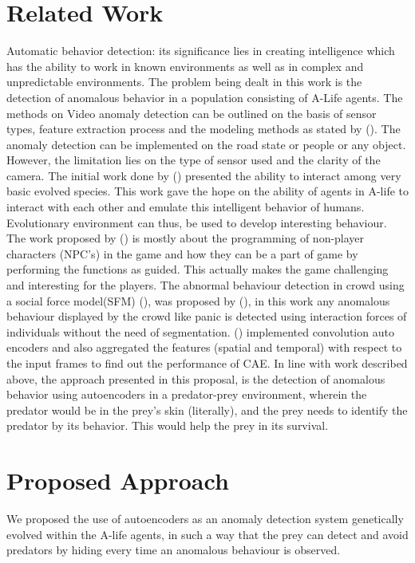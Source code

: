 \documentclass[letterpaper]{article}
\newcommand{\citea}[1]{\citeauthor{#1} (\citeyear{#1})}
\numberwithin{equation}{section}
\numberwithin{theorem}{section}
\numberwithin{lemma}{section}
\numberwithin{df}{section}
\begin{document}
\section{Related Work}

Automatic behavior detection: its significance lies in creating intelligence which has the ability to work in known environments as well as in complex and unpredictable environments. The problem being dealt in this work is the detection of anomalous behavior in a population consisting of A-Life agents. The methods on Video anomaly detection can be outlined on the basis of sensor types, feature extraction process and the modeling methods as stated by \citea{sodemann2012review}. The anomaly detection can be implemented on the road state or people or any object. However, the limitation lies on the type of sensor used and the clarity of the camera. The initial work done by \citea{ackley1991interactions} presented the ability to interact among very basic evolved species. This work gave the hope on the ability of agents in A-life to interact with each other and emulate this intelligent behavior of humans. Evolutionary environment can thus, be used to develop interesting behaviour. The work proposed by \citea{AIIDE1715912} is mostly about the programming of non-player characters (NPC’s) in the game and how they can be a part of game by performing the functions as guided. This actually makes the game challenging and interesting for the players. The abnormal behaviour detection in crowd using a social force model(SFM) \citea{helbing1995social}, was proposed by \citea{mehran2009abnormal}, in this work any anomalous behaviour displayed by the crowd like panic is detected using interaction forces of individuals without the need of segmentation. \citea{ribeiro2018study} implemented convolution auto encoders and also aggregated the features (spatial and temporal) with respect to the input frames to find out the performance of CAE. In line with work described above, the approach presented in this proposal, is the detection of anomalous behavior using autoencoders in a predator-prey environment, wherein the predator would be in the prey’s skin (literally), and the prey needs to identify the predator by its behavior. This would help the prey in its survival.

\section{Proposed Approach}

We proposed the use of autoencoders as an anomaly detection system genetically evolved within the A-life agents, in such a way that the prey can detect and avoid predators by hiding every time an anomalous behaviour is observed.
\end{document}
